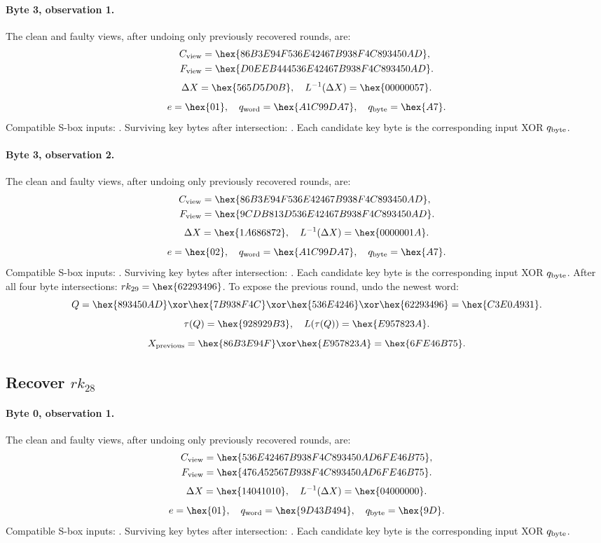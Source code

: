 \paragraph{Byte 3, observation 1.}
The clean and faulty views, after undoing only previously recovered rounds, are:
\[\begin{aligned}C_{\rm view}&=\hex{86B3E94F536E42467B938F4C893450AD},\\F_{\rm view}&=\hex{D0EEB444536E42467B938F4C893450AD}.\end{aligned}\]
\[\Delta X=\hex{565D5D0B},\quad L^{-1}(\Delta X)=\hex{00000057}.\]
\[e=\hex{01},\quad q_{\rm word}=\hex{A1C99DA7},\quad q_{\rm byte}=\hex{A7}.\]
Compatible S-box inputs: . Surviving key bytes after intersection: . Each candidate key byte is the corresponding input XOR $q_{\rm byte}$.
\paragraph{Byte 3, observation 2.}
The clean and faulty views, after undoing only previously recovered rounds, are:
\[\begin{aligned}C_{\rm view}&=\hex{86B3E94F536E42467B938F4C893450AD},\\F_{\rm view}&=\hex{9CDB813D536E42467B938F4C893450AD}.\end{aligned}\]
\[\Delta X=\hex{1A686872},\quad L^{-1}(\Delta X)=\hex{0000001A}.\]
\[e=\hex{02},\quad q_{\rm word}=\hex{A1C99DA7},\quad q_{\rm byte}=\hex{A7}.\]
Compatible S-box inputs: . Surviving key bytes after intersection: . Each candidate key byte is the corresponding input XOR $q_{\rm byte}$.
After all four byte intersections: $rk_{29}=\hex{62293496}$.
To expose the previous round, undo the newest word:
\[Q=\hex{893450AD}\xor\hex{7B938F4C}\xor\hex{536E4246}\xor\hex{62293496}=\hex{C3E0A931}.\]
\[\tau(Q)=\hex{928929B3},\quad L(\tau(Q))=\hex{E957823A}.\]
\[X_{\rm previous}=\hex{86B3E94F}\xor\hex{E957823A}=\hex{6FE46B75}.\]
\subsection*{Recover $rk_{28}$}
\paragraph{Byte 0, observation 1.}
The clean and faulty views, after undoing only previously recovered rounds, are:
\[\begin{aligned}C_{\rm view}&=\hex{536E42467B938F4C893450AD6FE46B75},\\F_{\rm view}&=\hex{476A52567B938F4C893450AD6FE46B75}.\end{aligned}\]
\[\Delta X=\hex{14041010},\quad L^{-1}(\Delta X)=\hex{04000000}.\]
\[e=\hex{01},\quad q_{\rm word}=\hex{9D43B494},\quad q_{\rm byte}=\hex{9D}.\]
Compatible S-box inputs: . Surviving key bytes after intersection: . Each candidate key byte is the corresponding input XOR $q_{\rm byte}$.
